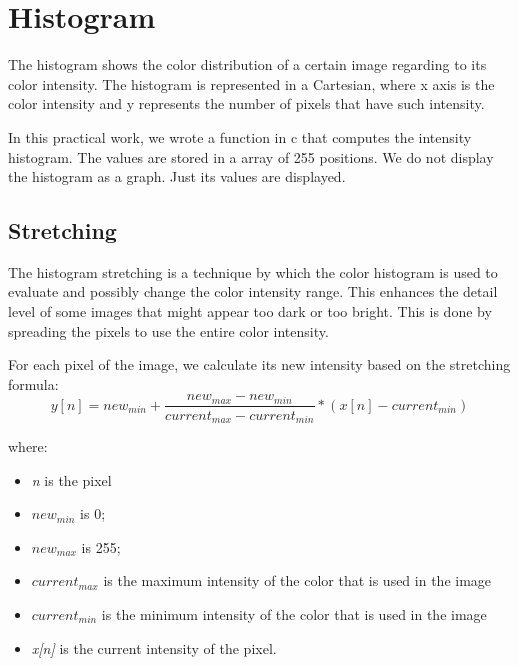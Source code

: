 \documentclass{article}
\begin{document}
\section{Histogram}

	The histogram shows the color distribution of a certain image regarding to its color intensity. The 		histogram is represented in a Cartesian, where x axis is the color intensity and y represents the number of pixels that have such intensity.

	In this practical work, we wrote a function in c that computes the intensity histogram. The values are stored in a array of 255 positions. We do not display the histogram as a graph. Just its values are displayed.

	\subsection{Stretching}

	The histogram stretching is a technique by which the color histogram is used to evaluate and possibly change the color intensity range. This enhances the 		detail level of some images that might appear too dark or too bright. This is done by spreading the pixels to use the entire color intensity.
	
	For each pixel of the image, we calculate its new intensity based on the stretching formula:
		\begin{equation}
			y[n]=new_{min}+\frac{new_{max}-new_{min}}{current_{max}-current_{min}}*(x[n]-current_{min})
			\label{eq:stretching}
		\end{equation}
	
		where: 
			\begin{itemize}
	  			\item {\it n} is the pixel		
	  			\item {\it $new_{min}$} is 0;
	  			\item {\it $new_{max}$} is 255; 
				\item {\it $current_{max}$} is the maximum intensity of the color that is used in the image
				\item {\it $current_{min}$} is the minimum intensity of the color that is used in the image
	  			\item {\it x[n]} is the current intensity of the pixel.
			\end{itemize}
\end{document}
